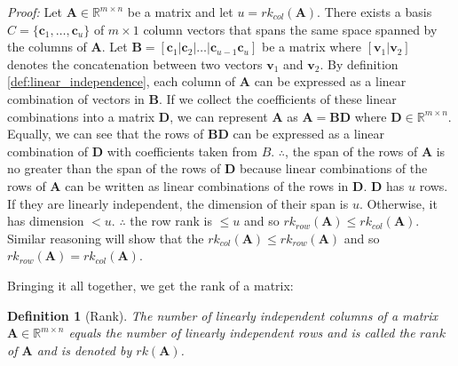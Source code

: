 \documentclass[a4paper,12pt]{book}
\newcommand{\matrx}[1]{\bm{#1}}
\newcommand{\vectr}[1]{\textbf{#1}}
\newcommand{\real}{\mathbb{R}}
\newcommand{\italic}[1]{\textit{#1}}
\newcommand{\rrank}[1]{rk_{row}(\matrx{#1})}
\newcommand{\crank}[1]{rk_{col}(\matrx{#1})}
\newtheorem{definition}{Definition}[section]
\begin{document}
	\noindent\italic{Proof:}
	Let $ \matrx{A} \in \real^{m \times n}$ be a matrix and let $ u = \crank{A} $. There exists a basis $ C = \{\vectr{c}_1, \ldots, \vectr{c}_u\} $ of $ m \times 1 $ column vectors that spans the same space spanned by the columns of $ \vectr{A} $. 
	Let $ \matrx{B} = [\vectr{c}_1 | \vectr{c}_2 | \ldots | \vectr{c}_{u - 1} \vectr{c}_u] $ be a matrix where $ [\vectr{v}_1 | \vectr{v}_2] $ denotes the concatenation between two vectors $ \vectr{v}_1 $ and $ \vectr{v}_2 $. By definition \ref{def:linear_independence}, each column of $ \matrx{A} $ can be expressed as a linear combination of vectors in $ \matrx{B} $. If we collect the coefficients of these linear combinations into a matrix $ \matrx{D} $, we can represent $ \matrx{A} $ as $ \matrx{A} = \matrx{BD} $ where $ \matrx{D} \in \real^{m \times n}$. Equally, we can see that the rows of $ \matrx{BD} $ can be expressed as a linear combination of $ \matrx{D} $ with coefficients taken from $ B $. $ \therefore $, the span of the rows of $ \matrx{A} $ is no greater than the span of the rows of $ \matrx{D} $ because linear combinations of the rows of $ \matrx{A} $ can be written as linear combinations of the rows in $ \matrx{D} $. $ \matrx{D} $ has $ u $ rows. If they are linearly independent, the dimension of their span is $ u $. Otherwise, it has dimension $ < u $. $ \therefore $ the row rank is $ \leq u $ and so $ \rrank{A} \leq \crank{A} $. Similar reasoning will show that the $ \crank{A} \leq \rrank{A} $ and so $ \rrank{A} = \crank{A} $.
	
	Bringing it all together, we get the rank of a matrix:
	
	\begin{definition}[Rank]
		\normalfont The number of linearly independent columns of a matrix $\textbf{A} \in \mathbb{R}^{m \times n}$ equals the number of linearly independent rows and is called the $\textit{rank}$ of $\textbf{A}$ and is denoted by $rk(\textbf{A})$.
	\end{definition}
	
	\printbibliography
\end{document}

